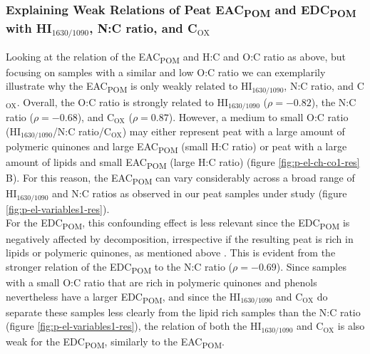 \documentclass[alpha-refs]{wiley-article-rmd}
\begin{document}
\begin{refsection}
\hypertarget{explaining-weak-relations-of-peat-eac-and-edc-with-hi_text16301090-nc-ratio-and-c_textox}{%
\subsubsection{\texorpdfstring{Explaining Weak Relations of Peat EAC\textsubscript{POM} and EDC\textsubscript{POM} with HI\(_\text{1630/1090}\), N:C ratio, and C\(_\text{OX}\)}{Explaining Weak Relations of Peat EAC and EDC with HI\_\textbackslash text\{1630/1090\}, N:C ratio, and C\_\textbackslash text\{OX\}}}\label{explaining-weak-relations-of-peat-eac-and-edc-with-hi_text16301090-nc-ratio-and-c_textox}}

Looking at the relation of the EAC\textsubscript{POM} and H:C and O:C ratio as above, but focusing on samples with a similar and low O:C ratio we can exemplarily illustrate why the EAC\textsubscript{POM} is only weakly related to HI\(_\text{1630/1090}\), N:C ratio, and C\(_\text{OX}\). Overall, the O:C ratio is strongly related to HI\(_\text{1630/1090}\) (\(\rho=-0.82\)), the N:C ratio (\(\rho=-0.68\)), and C\(_\text{OX}\) (\(\rho=0.87\)). However, a medium to small O:C ratio (HI\(_\text{1630/1090}\)/N:C ratio/C\(_\text{OX}\)) may either represent peat with a large amount of polymeric quinones and large EAC\textsubscript{POM} (small H:C ratio) or peat with a large amount of lipids and small EAC\textsubscript{POM} (large H:C ratio) (figure \ref{fig:p-el-ch-co1-res} B). For this reason, the EAC\textsubscript{POM} can vary considerably across a broad range of HI\(_\text{1630/1090}\) and N:C ratios as observed in our peat samples under study (figure \ref{fig:p-el-variables1-res}).\\
For the EDC\textsubscript{POM}, this confounding effect is less relevant since the EDC\textsubscript{POM} is negatively affected by decomposition, irrespective if the resulting peat is rich in lipids or polymeric quinones, as mentioned above \autocite{Fenner.2011,Bolton.2018}. This is evident from the stronger relation of the EDC\textsubscript{POM} to the N:C ratio (\(\rho=-0.69\)). Since samples with a small O:C ratio that are rich in polymeric quinones and phenols nevertheless have a larger EDC\textsubscript{POM}, and since the HI\(_\text{1630/1090}\) and C\(_\text{OX}\) do separate these samples less clearly from the lipid rich samples than the N:C ratio (figure \ref{fig:p-el-variables1-res}), the relation of both the HI\(_\text{1630/1090}\) and C\(_\text{OX}\) is also weak for the EDC\textsubscript{POM}, similarly to the EAC\textsubscript{POM}.


\end{refsection}
\end{document}

